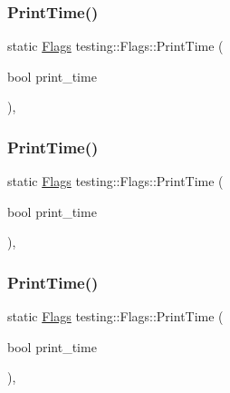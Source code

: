 \mbox{\label{structtesting_1_1_flags_af4dc8454995fb3691399a049e95de179}} 
\subsubsection{\texorpdfstring{PrintTime()}{PrintTime()}\hspace{0.1cm}{\footnotesize\ttfamily [1/3]}}
{\footnotesize\ttfamily static \mbox{\hyperlink{structtesting_1_1_flags}{Flags}} testing\+::\+Flags\+::\+Print\+Time (\begin{DoxyParamCaption}\item[{bool}]{print\+\_\+time }\end{DoxyParamCaption})\hspace{0.3cm}{\ttfamily [inline]}, {\ttfamily [static]}}

\mbox{\label{structtesting_1_1_flags_af4dc8454995fb3691399a049e95de179}} 
\subsubsection{\texorpdfstring{PrintTime()}{PrintTime()}\hspace{0.1cm}{\footnotesize\ttfamily [2/3]}}
{\footnotesize\ttfamily static \mbox{\hyperlink{structtesting_1_1_flags}{Flags}} testing\+::\+Flags\+::\+Print\+Time (\begin{DoxyParamCaption}\item[{bool}]{print\+\_\+time }\end{DoxyParamCaption})\hspace{0.3cm}{\ttfamily [inline]}, {\ttfamily [static]}}

\mbox{\label{structtesting_1_1_flags_af4dc8454995fb3691399a049e95de179}} 
\subsubsection{\texorpdfstring{PrintTime()}{PrintTime()}\hspace{0.1cm}{\footnotesize\ttfamily [3/3]}}
{\footnotesize\ttfamily static \mbox{\hyperlink{structtesting_1_1_flags}{Flags}} testing\+::\+Flags\+::\+Print\+Time (\begin{DoxyParamCaption}\item[{bool}]{print\+\_\+time }\end{DoxyParamCaption})\hspace{0.3cm}{\ttfamily [inline]}, {\ttfamily [static]}}

